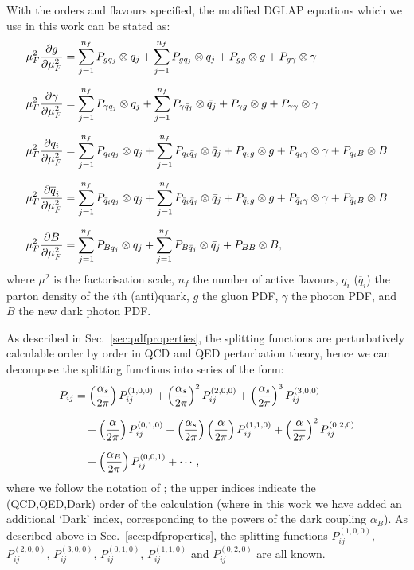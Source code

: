 \documentclass[withindex,glossary]{cam-thesis}
\begin{document}
With the orders and flavours specified, the modified DGLAP equations which we use in this work can be stated as: 
%
\begin{align}
\label{eq:basicdglap}
\mu_F^2 \frac{\partial g}{\partial \mu_F^2} &= \sum_{j=1}^{n_f} P_{gq_j} \otimes q_j +\sum_{j=1}^{n_f} P_{g\bar{q}_j} \otimes \bar{q}_j + P_{gg}\otimes g + P_{g\gamma}\otimes \gamma \notag\\[1.5ex]
\mu_F^2 \frac{\partial \gamma}{\partial \mu_F^2} &= \sum_{j=1}^{n_f} P_{\gamma q_j} \otimes q_j +\sum_{j=1}^{n_f} P_{\gamma\bar{q}_j} \otimes \bar{q}_j + P_{\gamma g}\otimes g + P_{\gamma\gamma}\otimes\gamma\notag \\[1.5ex]
\mu_F^2 \frac{\partial q_i}{\partial \mu_F^2} &= \sum_{j=1}^{n_f} P_{q_iq_j} \otimes q_j +\sum_{j=1}^{n_f} P_{q_i\bar{q}_j} \otimes \bar{q}_j + P_{q_ig}\otimes g + P_{q_i\gamma}\otimes \gamma + P_{q_iB} \otimes B \\[1.5ex]
\mu_F^2 \frac{\partial \overline{q}_i}{\partial \mu_F^2} &= \sum_{j=1}^{n_f} P_{\bar{q}_iq_j} \otimes q_j +\sum_{j=1}^{n_f} P_{\bar{q}_i\bar{q}_j} \otimes \bar{q}_j + P_{\bar{q}_ig}\otimes g + P_{\bar{q}_i\gamma}\otimes \gamma + P_{\bar{q}_iB} \otimes B \notag\\[1.5ex]
\mu_F^2 \frac{\partial B}{\partial \mu_F^2} &= \sum_{j=1}^{n_f} P_{Bq_j} \otimes q_j +\sum_{j=1}^{n_f} P_{B\bar{q}_j} \otimes \bar{q}_j + P_{BB}\otimes B,\notag
\end{align}
%
where $\mu^2$ is the factorisation scale, $n_f$ the number of active
flavours, $q_i$ ($\overline{q}_i$) the parton density of the $i$th (anti)quark, $g$ the gluon PDF, $\gamma$ the photon PDF, and
$B$ the new dark photon PDF.

As described in Sec.~\ref{sec:pdfproperties}, the splitting functions are perturbatively calculable order by order in QCD and QED perturbation theory, hence we can decompose the splitting functions into series of the form:
\begin{align}
\label{eq:splittingexpansion}
P_{ij} &= \left( \frac{\alpha_s}{2\pi} \right) P_{ij}^{(1,0,0)} + \left( \frac{\alpha_s}{2\pi} \right)^2 P_{ij}^{(2,0,0)} + \left(\frac{\alpha_s}{2\pi}\right)^3 P_{ij}^{(3,0,0)} \notag\\[1.5ex]
&\quad+ \left( \frac{\alpha}{2\pi} \right) P_{ij}^{(0,1,0)} + \left( \frac{\alpha_s}{2\pi} \right) \left( \frac{\alpha}{2\pi} \right) P_{ij}^{(1,1,0)} + \left( \frac{\alpha}{2\pi} \right)^2 P_{ij}^{(0,2,0)} \\[1.5ex]
&\quad+ \left( \frac{\alpha_B}{2\pi} \right) P_{ij}^{(0,0,1)} + \cdots, \notag
\end{align}
where we follow the notation of \cite{deFlorian:2015ujt,deFlorian:2016gvk}; the upper indices indicate
the (QCD,QED,Dark) order of the calculation (where in this work we have added an additional `Dark' index, corresponding
to the powers of the dark coupling $\alpha_B$). As described above in Sec.~\ref{sec:pdfproperties}, the splitting functions $P_{ij}^{(1,0,0)}$, $P_{ij}^{(2,0,0)}$, $P_{ij}^{(3,0,0)}$, $P_{ij}^{(0,1,0)}$, $P_{ij}^{(1,1,0)}$ and $P_{ij}^{(0,2,0)}$ are all known.
\end{document}
